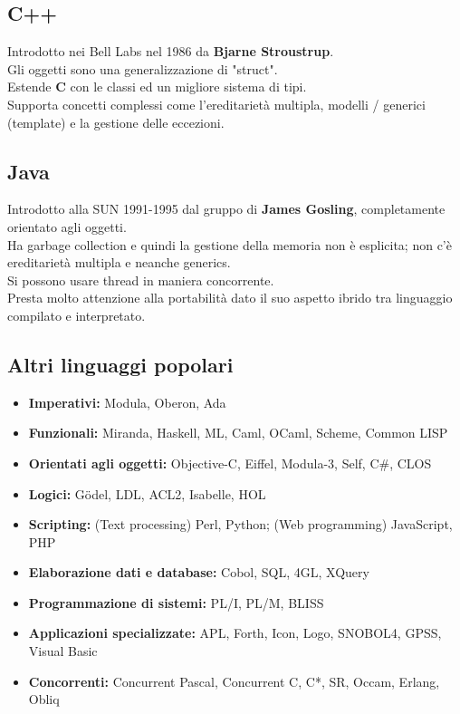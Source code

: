 \documentclass[12pt,a4paper]{article}
\begin{document}
\subsection{C++}
Introdotto nei Bell Labs nel 1986 da \textbf{Bjarne Stroustrup}.\\
Gli oggetti sono una generalizzazione di "struct".\\
Estende \textbf{C} con le classi ed un migliore sistema di tipi.\\
Supporta concetti complessi come l'ereditarietà multipla, modelli / generici (template) e la gestione delle eccezioni.

\subsection{Java}
Introdotto alla SUN 1991-1995 dal gruppo di \textbf{James Gosling}, completamente orientato agli oggetti.\\
Ha garbage collection e quindi la gestione della memoria non è esplicita; non c'è ereditarietà multipla e neanche generics.\\
Si possono usare thread in maniera concorrente.\\
Presta molto attenzione alla portabilità dato il suo aspetto ibrido tra linguaggio compilato e interpretato.

\subsection{Altri linguaggi popolari}
\begin{itemize}
    \item \textbf{Imperativi:} Modula, Oberon, Ada
    \item \textbf{Funzionali:} Miranda, Haskell, ML, Caml, OCaml, Scheme, Common LISP
    \item \textbf{Orientati agli oggetti:} Objective-C, Eiffel, Modula-3, Self, C\#, CLOS
    \item \textbf{Logici:} Gödel, LDL, ACL2, Isabelle, HOL
    \item \textbf{Scripting:} (Text processing) Perl, Python; (Web programming) JavaScript, PHP
    \item \textbf{Elaborazione dati e database:} Cobol, SQL, 4GL, XQuery
    \item \textbf{Programmazione di sistemi:} PL/I, PL/M, BLISS
    \item \textbf{Applicazioni specializzate:} APL, Forth, Icon, Logo, SNOBOL4, GPSS, Visual Basic
    \item \textbf{Concorrenti:} Concurrent Pascal, Concurrent C, C*, SR, Occam, Erlang, Obliq
\end{itemize}
\end{document}
